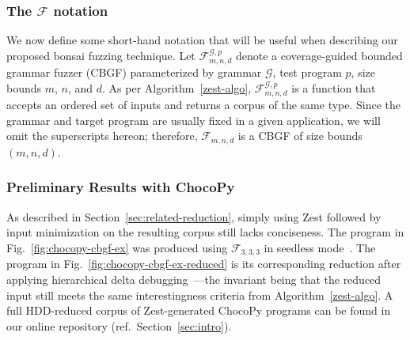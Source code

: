 \documentclass[conference]{IEEEtran}
\newcommand{\tech}{bonsai fuzzing} \newcommand{\Tech}{Bonsai fuzzing} \newcommand{\TECH}{Bonsai Fuzzing}
\begin{document}
\subsubsection*{The $\mathcal{F}$ notation}

We now define some short-hand notation that will be useful when describing our proposed \tech{} technique. Let $\mathcal{F}^{\mathcal{G}, p}_{m, n, d}$ denote a coverage-guided bounded grammar fuzzer (CBGF) parameterized by grammar $\mathcal{G}$, test program $p$, size bounds $m$, $n$, and $d$. As per Algorithm~\ref{zest-algo}, $\mathcal{F}^{\mathcal{G}, p}_{m, n, d}$ is a function that accepts an ordered set of inputs and returns a corpus of the same type. Since the grammar and target program are usually fixed in a given application, we will omit the superscripts hereon; therefore, $\mathcal{F}_{m,n,d}$ is a CBGF of size bounds $(m,n,d)$.


\subsubsection*{Preliminary Results with ChocoPy} 

As described in Section~\ref{sec:related-reduction}, simply using Zest followed by input minimization on the resulting corpus still lacks conciseness. The program in Fig.~\ref{fig:chocopy-cbgf-ex} was produced using $\mathcal{F}_{3,3,3}$ in seedless mode~\cite{You19}. The program in  Fig.~\ref{fig:chocopy-cbgf-ex-reduced} is its corresponding reduction after applying hierarchical delta debugging~\cite{Misherghi06}---the invariant being that the reduced input still meets the same interestingness criteria from Algorithm~\ref{zest-algo}. A full HDD-reduced corpus of Zest-generated ChocoPy programs can be found in our online repository (ref.~Section~\ref{sec:intro}).
\end{document}
